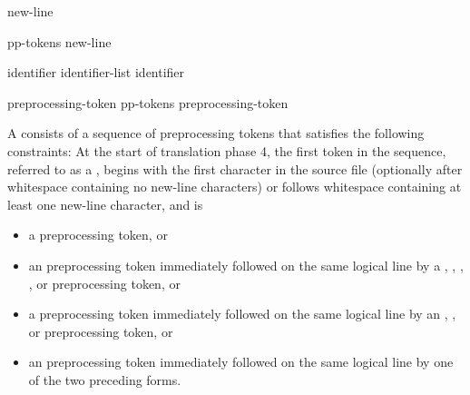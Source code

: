 \begin{bnf}
\br
     new-line
\end{bnf}

\begin{bnf}
\br
    pp-tokens new-line
\end{bnf}

\begin{bnf}
\br
\end{bnf}

\begin{bnf}
\br
    identifier\br
    identifier-list \terminal{,} identifier
\end{bnf}

\begin{bnf}
\br
\end{bnf}

\begin{bnf}
\br
    preprocessing-token\br
    pp-tokens preprocessing-token
\end{bnf}

\begin{bnf}
\br
\end{bnf}

\pnum
A  consists of a sequence of preprocessing tokens
that satisfies the following constraints:
At the start of translation phase 4,
the first token in the sequence,
referred to as a ,
begins with the first character in the source file
(optionally after whitespace containing no new-line characters) or
follows whitespace containing at least one new-line character,
and is

\begin{itemize}
\item
a \tcode{\#} preprocessing token, or

\item
an  preprocessing token
immediately followed on the same logical line by a
,
\tcode{<},
,
, or
\tcode{:}
preprocessing token, or

\item
a  preprocessing token
immediately followed on the same logical line by an
,
\tcode{:}, or
\tcode{;}
preprocessing token, or

\item
an  preprocessing token
immediately followed on the same logical line by
one of the two preceding forms.
\end{itemize}

